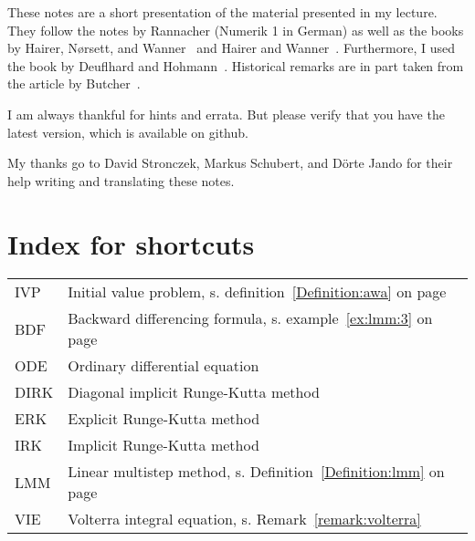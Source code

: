 These notes are a short presentation of the material presented in my
lecture. They follow the notes by Rannacher (Numerik 1 in German)
as well as the books by Hairer, Nørsett, and
Wanner~\cite{HairerNorsettWanner93} and Hairer and
Wanner~\cite{HairerWanner10}. Furthermore, I used the book by
Deuflhard and Hohmann~\cite{DeuflhardBornemann08}. Historical remarks
are in part taken from the article by Butcher~\cite{Butcher96}.

I am always thankful for hints and errata. But please verify that you
have the latest version, which is available on github.

My thanks go to David Stronczek, Markus Schubert, and Dörte Jando for their help
writing and translating these notes.

\clearpage
\section*{Index for shortcuts}
\begin{tabular}{ll}
  IVP & Initial value problem, s. definition~\ref{Definition:awa} on page~\pageref{Definition:awa}\\
  BDF & Backward differencing formula, s. example~\ref{ex:lmm:3} on page~\pageref{ex:lmm:3}\\
  ODE & Ordinary differential equation\\
  DIRK & Diagonal implicit Runge-Kutta method\\
  ERK & Explicit Runge-Kutta method\\
  IRK & Implicit Runge-Kutta method\\
  LMM & Linear multistep method, s. Definition~\ref{Definition:lmm} on
  page~\pageref{ex:lmm:1}\\
  VIE & Volterra integral equation, s. Remark~\vref{remark:volterra}
\end{tabular}

